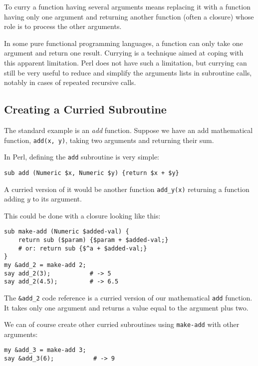 To curry a function having several arguments means replacing 
it with a function having only one argument and returning 
another function (often a closure) whose role is to 
process the other arguments.

In some pure functional programming languages, a function 
can only take one argument and return one result. Currying 
is a technique aimed at coping with this apparent limitation. 
Perl does not have such a limitation, but currying can still 
be very useful to reduce and simplify the arguments lists 
in subroutine calls, notably in cases of repeated recursive 
calls.


\subsection{Creating a Curried Subroutine}

The standard example is an \emph{add} function. Suppose 
we have an add mathematical function, \verb'add(x, y)', 
taking two arguments and returning their sum. 

In Perl, defining the {\tt add} subroutine is very simple:

\begin{verbatim}
sub add (Numeric $x, Numeric $y) {return $x + $y}
\end{verbatim}

A curried version of it would be another function 
\verb'add_y(x)' returning a function adding $y$ to 
its argument.

This could be done with a closure looking like this:

\begin{verbatim}
sub make-add (Numeric $added-val) {
    return sub ($param) {$param + $added-val;}    
    # or: return sub {$^a + $added-val;}
}
my &add_2 = make-add 2;
say add_2(3);           # -> 5
say add_2(4.5);         # -> 6.5
\end{verbatim}

The \verb'&add_2' code reference is a curried version 
of our mathematical {\tt add} function. It takes only 
one argument and returns a value equal to the argument 
plus two.

We can of course create other curried subroutines using 
{\tt make-add} with other arguments:

\begin{verbatim}
my &add_3 = make-add 3;
say &add_3(6);           # -> 9
\end{verbatim}

